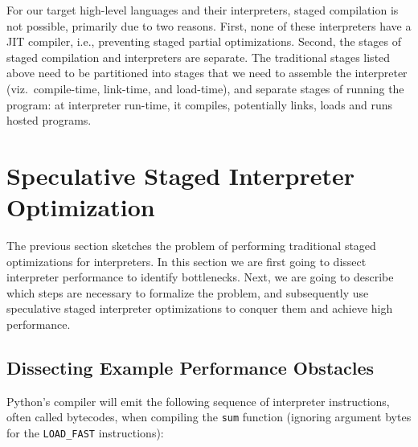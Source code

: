 \documentclass[preprint,10pt]{popl14conf}
\begin{document}
For our target high-level languages and their interpreters, staged compilation is not possible,
primarily due to two reasons.
First, none of these interpreters have a JIT compiler, i.e., preventing staged partial
optimizations.
Second, the stages of staged compilation and interpreters are separate.
The traditional stages listed above need to be partitioned into stages that we need to assemble the
interpreter (viz.~compile-time, link-time, and load-time), and separate stages of running the
program: at interpreter run-time, it compiles, potentially links, loads and runs hosted programs.






\section{Speculative Staged Interpreter Optimization}\label{s:theory}

The previous section sketches the problem of performing traditional staged optimizations for
interpreters.
In this section we are first going to dissect interpreter performance to identify bottlenecks.
Next, we are going to describe which steps are necessary to formalize the problem, and subsequently
use speculative staged interpreter optimizations to conquer them and achieve high performance.


\subsection{Dissecting Example Performance Obstacles}\label{ss:dissecting-perf}

\newcommand{\pySum}{\texttt{sum}}
\newcommand{\loadFast}{\texttt{LOAD_FAST}}
\newcommand{\storeFast}{\texttt{STORE_FAST}}
\newcommand{\binaryAdd}{\texttt{BINARY_ADD}}

Python's compiler will emit the following sequence of interpreter instructions, often called
bytecodes, when compiling the \pySum{} function (ignoring argument bytes for the \loadFast{}
instructions):
\begin{center}
\end{center}
\end{document}
